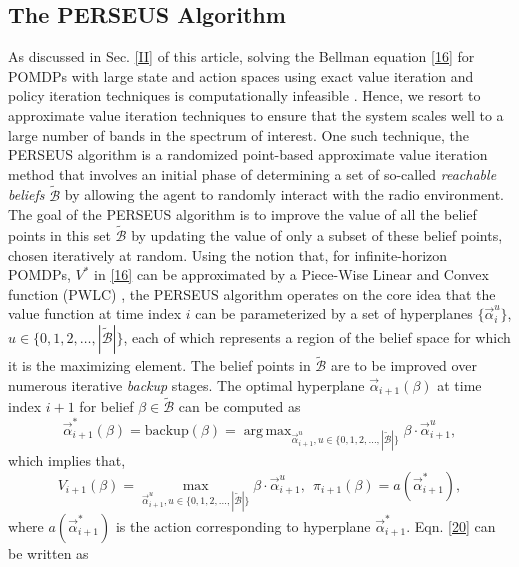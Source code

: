 \documentclass[10pt,twocolumn]{IEEEtran}
\DeclareMathOperator*{\argmax}{arg\,max}
\begin{document}
\subsection{The PERSEUS Algorithm}
As discussed in Sec. \ref{II} of this article, solving the Bellman equation \eqref{16} for POMDPs with large state and action spaces using exact value iteration and policy iteration techniques is computationally infeasible \cite{DBLP:journals/corr/abs-1109-2145}. Hence, we resort to approximate value iteration techniques to ensure that the system scales well to a large number of bands in the spectrum of interest. One such technique, the PERSEUS algorithm is a randomized point-based approximate value iteration method that involves an initial phase of determining a set of so-called \emph{reachable beliefs} $\tilde{\mathcal{B}}$ by allowing the agent to randomly interact with the radio environment. The goal of the PERSEUS algorithm is to improve the value of all the belief points in this set $\tilde{\mathcal{B}}$ by updating the value of only a subset of these belief points, chosen iteratively at random. Using the notion that, for infinite-horizon POMDPs, $V^*$ in \eqref{16} can be approximated by a Piece-Wise Linear and Convex function (PWLC) \cite{DBLP:journals/corr/abs-1109-2145}, the PERSEUS algorithm operates on the core idea that the value function at time index $i$ can be parameterized by a set of hyperplanes $\{\vec{\alpha}_i^{u}\}$, $u {\in} \{0,1,2,\dots,|\tilde{\mathcal{B}}|\}$, each of which represents a region of the belief space for which it is the maximizing element. The belief points in $\tilde{\mathcal{B}}$ are to be improved over numerous iterative \emph{backup} stages. The optimal hyperplane $\vec{\alpha}_{i+1}(\beta)$ at time index $i{+}1$ for belief $\beta \in \tilde{\mathcal{B}}$ can be computed as
\begin{equation}\label{20}
    \vec{\alpha}_{i+1}^{*}(\beta) = \text{backup}(\beta) = \argmax_{\vec{\alpha}_{i+1}^u, u {\in} \{0, 1, 2, \dots, |\tilde{\mathcal{B}}|\}} \beta \cdot \vec{\alpha}_{i+1}^u,
\end{equation}
which implies that,
\begin{equation}\label{40}
        V_{i+1}(\beta) =\!\!\!\!\!\max_{\vec{\alpha}_{i+1}^u, u {\in} \{0, 1, 2, \dots, |\tilde{\mathcal{B}}|\}} \beta \cdot \vec{\alpha}_{i+1}^u,
\ \ \pi_{i+1}(\beta) = a(\vec{\alpha}_{i+1}^{*}),
\end{equation}
where $a(\vec{\alpha}_{i+1}^{*})$ is the action corresponding to hyperplane $\vec{\alpha}_{i+1}^{*}$.
Eqn. \eqref{20} can be written as
\end{document}
